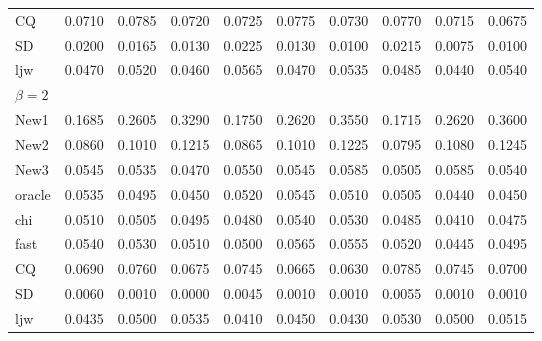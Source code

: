 \documentclass[review]{elsarticle}
\theoremstyle{plain}
\theoremstyle{definition}
\theoremstyle{remark}
\begin{document}
\begin{table}[ht]
\begin{tabular}{llllllllll}
CQ & 0.0710 & 0.0785 & 0.0720 & 0.0725 & 0.0775 & 0.0730 & 0.0770 & 0.0715 & 0.0675 \\ 
SD & 0.0200 & 0.0165 & 0.0130 & 0.0225 & 0.0130 & 0.0100 & 0.0215 & 0.0075 & 0.0100 \\ 
ljw & 0.0470 & 0.0520 & 0.0460 & 0.0565 & 0.0470 & 0.0535 & 0.0485 & 0.0440 & 0.0540 \\ 
    $\beta=2$\\
New1 & 0.1685 & 0.2605 & 0.3290 & 0.1750 & 0.2620 & 0.3550 & 0.1715 & 0.2620 & 0.3600 \\ 
New2 & 0.0860 & 0.1010 & 0.1215 & 0.0865 & 0.1010 & 0.1225 & 0.0795 & 0.1080 & 0.1245 \\ 
New3 & 0.0545 & 0.0535 & 0.0470 & 0.0550 & 0.0545 & 0.0585 & 0.0505 & 0.0585 & 0.0540 \\ 
oracle & 0.0535 & 0.0495 & 0.0450 & 0.0520 & 0.0545 & 0.0510 & 0.0505 & 0.0440 & 0.0450 \\ 
chi & 0.0510 & 0.0505 & 0.0495 & 0.0480 & 0.0540 & 0.0530 & 0.0485 & 0.0410 & 0.0475 \\ 
fast & 0.0540 & 0.0530 & 0.0510 & 0.0500 & 0.0565 & 0.0555 & 0.0520 & 0.0445 & 0.0495 \\ 
CQ & 0.0690 & 0.0760 & 0.0675 & 0.0745 & 0.0665 & 0.0630 & 0.0785 & 0.0745 & 0.0700 \\ 
SD & 0.0060 & 0.0010 & 0.0000 & 0.0045 & 0.0010 & 0.0010 & 0.0055 & 0.0010 & 0.0010 \\ 
ljw & 0.0435 & 0.0500 & 0.0535 & 0.0410 & 0.0450 & 0.0430 & 0.0530 & 0.0500 & 0.0515 \\ 
\bottomrule
\end{tabular}
\end{table}
\end{document}
